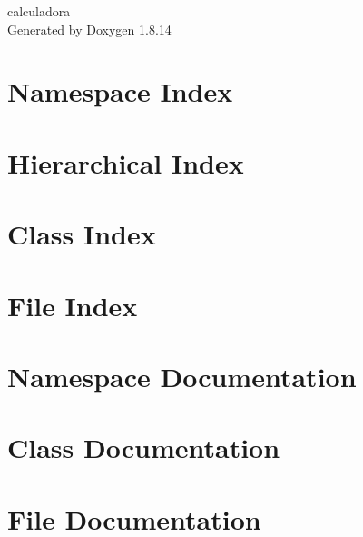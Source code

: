 \documentclass[twoside]{book}
\newcommand{\+}{\discretionary{\mbox{\scriptsize$\hookleftarrow$}}{}{}}
\newcommand{\clearemptydoublepage}{%
  \newpage{\pagestyle{empty}\cleardoublepage}%
}
\begin{document}
\hypersetup{pageanchor=false,
             bookmarksnumbered=true,
             pdfencoding=unicode
            }
\begin{titlepage}
\vspace*{7cm}
\begin{center}%
{\Large calculadora }\\
\vspace*{1cm}
{\large Generated by Doxygen 1.8.14}\\
\end{center}
\end{titlepage}
\clearemptydoublepage
{}
\tableofcontents
\clearemptydoublepage
{}
\hypersetup{pageanchor=true}

\chapter{Namespace Index}

\chapter{Hierarchical Index}

\chapter{Class Index}

\chapter{File Index}

\chapter{Namespace Documentation}

\chapter{Class Documentation}


\chapter{File Documentation}


















\backmatter
\newpage
{}
\clearemptydoublepage
{}
\printindex
\end{document}
